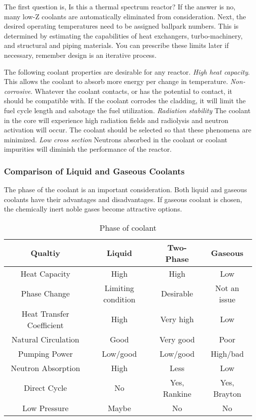 The first question is, Is this a thermal spectrum reactor? If the answer is no, many low-Z coolants are automatically eliminated from consideration.
Next, the desired operating temperatures need to be assigned ballpark numbers. This is determined by estimating the capabilities of heat exchangers, turbo-machinery, and structural and piping materials. You can prescribe these limits later if necessary, remember design is an iterative process. 

The following coolant properties are desirable for any reactor. \emph{High heat capacity}. This allows the coolant to absorb more energy per change in temperature. \emph{Non-corrosive}. Whatever the coolant contacts, or has the potential to contact, it should be compatible with. If the coolant corrodes the cladding, it will limit the fuel cycle length and sabotage the fuel utilization. \emph{Radiation stability} The coolant in the core will experience high radiation fields and radiolysis and neutron activation will occur. The coolant should be selected so that these phenomena are minimized. \emph{Low cross section} Neutrons absorbed in the coolant or coolant impurities will diminish the performance of the reactor.%


\subsubsection{Comparison of Liquid and Gaseous Coolants}
The phase of the coolant is an important consideration. Both liquid and gaseous coolants have their advantages and disadvantages.
If gaseous coolant is chosen, the chemically inert noble gases become attractive options.

\begin{table}[!ht]
\begin{tabular}{c|c|c|c}
  Qualtiy & Liquid & Two-Phase & Gaseous \\
  \hline
  Heat Capacity & High & High & Low \\
  Phase Change & Limiting condition & Desirable & Not an issue \\
  Heat Transfer Coefficient & High & Very high & Low \\
  Natural Circulation & Good & Very good & Poor \\
  Pumping Power & Low/good & Low/good & High/bad\\
  Neutron Absorption & High & Less & Low\\
  Direct Cycle & No & Yes, Rankine & Yes, Brayton\\
  Low Pressure & Maybe & No & No\\
  \hline
\end{tabular}
\caption{Phase of coolant}
\end{table}

